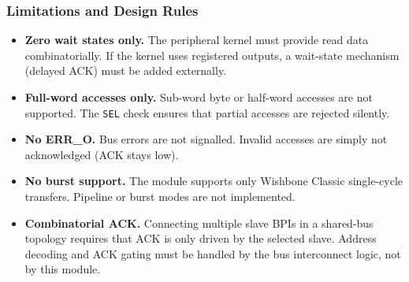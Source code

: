 \subsubsection{Limitations and Design Rules}

\begin{itemize}
  \item \textbf{Zero wait states only.}
    The peripheral kernel must provide read data combinatorially.
    If the kernel uses registered outputs, a wait-state mechanism
    (delayed ACK) must be added externally.
  \item \textbf{Full-word accesses only.}
    Sub-word byte or half-word accesses are not supported.
    The \texttt{SEL} check ensures that partial accesses are rejected silently.
  \item \textbf{No ERR\_O.}
    Bus errors are not signalled. Invalid accesses are simply not acknowledged
    (ACK stays low).
  \item \textbf{No burst support.}
    The module supports only Wishbone Classic single-cycle transfers.
    Pipeline or burst modes are not implemented.
  \item \textbf{Combinatorial ACK.}
    Connecting multiple slave BPIs in a shared-bus topology requires
    that ACK is only driven by the selected slave. Address decoding
    and ACK gating must be handled by the bus interconnect logic, not
    by this module.
\end{itemize}



